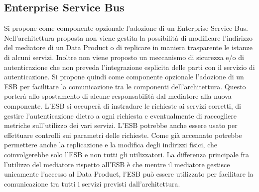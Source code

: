 \documentclass[a4paper,12pt]{report}
\begin{document}
\subsection{Enterprise Service Bus}
Si propone come componente opzionale l'adozione di un Enterprise Service Bus.
Nell'architettura proposta non viene gestita la possibilità di modificare l'indirizzo del mediatore di un Data Product o di replicare in maniera trasparente le istanze di alcuni servizi.
Inoltre non viene proposto un meccanismo di sicurezza e/o di autenticazione che non preveda l'integrazione esplicita delle parti con il servizio di autenticazione.
Si propone quindi come componente opzionale l'adozione di un ESB per facilitare la comunicazione tra le componenti dell'architettura.
Questo porterà allo spostamento di alcune responsabilità dal mediatore alla nuova componente.
L'ESB si occuperà di instradare le richieste ai servizi corretti, di gestire l'autenticazione dietro a ogni richiesta e  eventualmente di raccogliere metriche sull'utilizzo dei vari servizi.
L'ESB potrebbe anche essere usato per effettuare controlli sui parametri delle richieste.
Come già accennato potrebbe permettere anche la replicazione e la modifica degli indirizzi fisici, che coinvolgerebbe solo l'ESB e non tutti gli utilizzatori.
La differenza principale fra l'utilizzo del mediatore rispetto all'ESB è che mentre il mediatore gestisce unicamente l'accesso al Data Product, l'ESB può essere utilizzato per facilitare la comunicazione tra tutti i servizi previsti dall'architettura.
\end{document}
